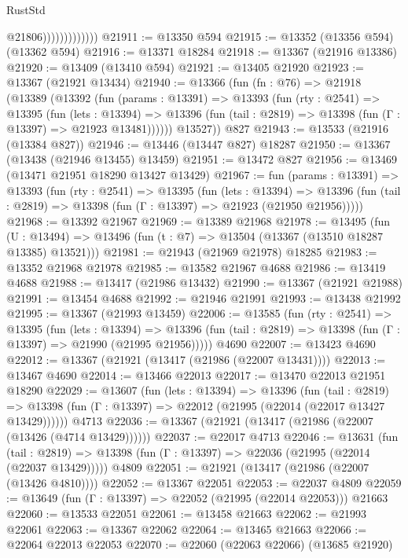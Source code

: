 \begin{lexlean}{RustStd}
\begin{coremodule}
                              @21806)))))))))))))
@21911 := @13350 @594
@21915 := @13352 (@13356 @594) (@13362 @594)
@21916 := @13371 @18284
@21918 := @13367 (@21916 @13386)
@21920 := @13409 (@13410 @594)
@21921 := @13405 @21920
@21923 := @13367 (@21921 @13434)
@21940 := @13366
    (fun (fn : @76) =>
    @21918
      (@13389
        (@13392
          (fun (params : @13391) =>
          @13393
            (fun (rty : @2541) =>
            @13395
              (fun (lets : @13394) =>
              @13396 (fun (tail : @2819) => @13398 (fun (Γ : @13397) => @21923 @13481))))))
        @13527))
    @827
@21943 := @13533 (@21916 (@13384 @827))
@21946 := @13446 (@13447 @827) @18287
@21950 := @13367 (@13438 (@21946 @13455) @13459)
@21951 := @13472 @827
@21956 := @13469 (@13471 @21951 @18290 @13427 @13429)
@21967 := fun (params : @13391) =>
  @13393
    (fun (rty : @2541) =>
    @13395
      (fun (lets : @13394) =>
      @13396 (fun (tail : @2819) => @13398 (fun (Γ : @13397) => @21923 (@21950 @21956)))))
@21968 := @13392 @21967
@21969 := @13389 @21968
@21978 := @13495
    (fun (U : @13494) => @13496 (fun (t : @7) => @13504 (@13367 (@13510 @18287 @13385) @13521)))
@21981 := @21943 (@21969 @21978) @18285
@21983 := @13352 @21968 @21978
@21985 := @13582 @21967 @4688
@21986 := @13419 @4688
@21988 := @13417 (@21986 @13432)
@21990 := @13367 (@21921 @21988)
@21991 := @13454 @4688
@21992 := @21946 @21991
@21993 := @13438 @21992
@21995 := @13367 (@21993 @13459)
@22006 := @13585
    (fun (rty : @2541) =>
    @13395
      (fun (lets : @13394) =>
      @13396 (fun (tail : @2819) => @13398 (fun (Γ : @13397) => @21990 (@21995 @21956)))))
    @4690
@22007 := @13423 @4690
@22012 := @13367 (@21921 (@13417 (@21986 (@22007 @13431))))
@22013 := @13467 @4690
@22014 := @13466 @22013
@22017 := @13470 @22013 @21951 @18290
@22029 := @13607
    (fun (lets : @13394) =>
    @13396
      (fun (tail : @2819) =>
      @13398 (fun (Γ : @13397) => @22012 (@21995 (@22014 (@22017 @13427 @13429))))))
    @4713
@22036 := @13367 (@21921 (@13417 (@21986 (@22007 (@13426 (@4714 @13429))))))
@22037 := @22017 @4713
@22046 := @13631
    (fun (tail : @2819) => @13398 (fun (Γ : @13397) => @22036 (@21995 (@22014 (@22037 @13429)))))
    @4809
@22051 := @21921 (@13417 (@21986 (@22007 (@13426 @4810))))
@22052 := @13367 @22051
@22053 := @22037 @4809
@22059 := @13649 (fun (Γ : @13397) => @22052 (@21995 (@22014 @22053))) @21663
@22060 := @13533 @22051
@22061 := @13458 @21663
@22062 := @21993 @22061
@22063 := @13367 @22062
@22064 := @13465 @21663
@22066 := @22064 @22013 @22053
@22070 := @22060 (@22063 @22066) (@13685 @21920)

\end{coremodule}
\end{lexlean}
